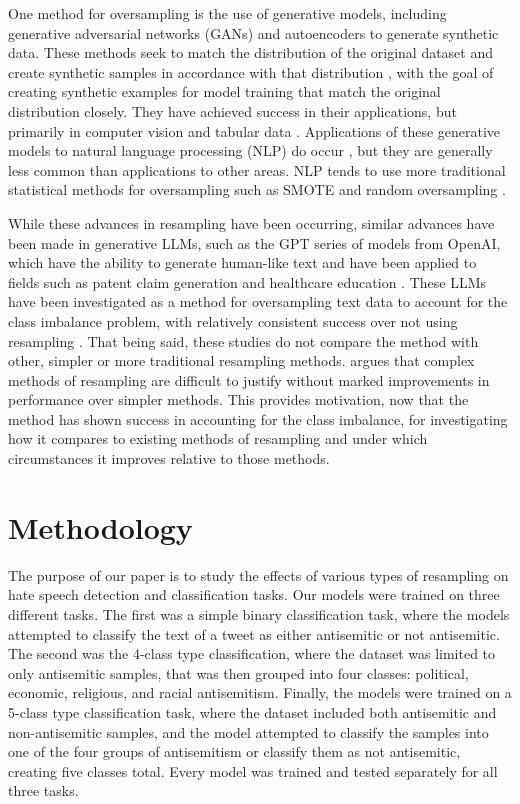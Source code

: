 \documentclass[runningheads]{llncs}
\begin{document}
One method for oversampling is the use of generative models, including generative adversarial networks (GANs) and autoencoders to generate synthetic data. These methods seek to match the distribution of the original dataset and create synthetic samples in accordance with that distribution \cite{hao}, with the goal of creating synthetic examples for model training that match the original distribution closely. They have achieved success in their applications, but primarily in computer vision and tabular data \cite{hao} \cite{engelmann} \cite{bellinger} \cite{dai}. Applications of these generative models to natural language processing (NLP) do occur \cite{phung}, but they are generally less common than applications to other areas. NLP tends to use more traditional statistical methods for oversampling such as SMOTE and random oversampling \cite{wijaya} \cite{glazkova}.

While these advances in resampling have been occurring, similar advances have been made in generative LLMs, such as the GPT series of models from OpenAI, which have the ability to generate human-like text \cite{floridi} and have been applied to fields such as patent claim generation \cite{hsiang} and healthcare education \cite{sallam}. These LLMs have been investigated as a method for oversampling text data to account for the class imbalance problem, with relatively consistent success over not using resampling \cite{edwards} \cite{usuga} \cite{shaikh}. That being said, these studies do not compare the method with other, simpler or more traditional resampling methods.  \cite{drummond} argues that complex methods of resampling are difficult to justify without marked improvements in performance over simpler methods. This provides motivation, now that the method has shown success in accounting for the class imbalance, for investigating how it compares to existing methods of resampling and under which circumstances it improves relative to those methods.

\section{Methodology}
The purpose of our paper is to study the effects of various types of resampling on hate speech detection and classification tasks. Our models were trained on three different tasks. The first was a simple binary classification task, where the models attempted to classify the text of a tweet as either antisemitic or not antisemitic. The second was the 4-class type classification, where the dataset was limited to only antisemitic samples, that was then grouped into four classes: political, economic, religious, and racial antisemitism. Finally, the models were trained on a 5-class type classification task, where the dataset included both antisemitic and non-antisemitic samples, and the model attempted to classify the samples into one of the four groups of antisemitism or classify them as not antisemitic, creating five classes total. Every model was trained and tested separately for all three tasks.
\end{document}
